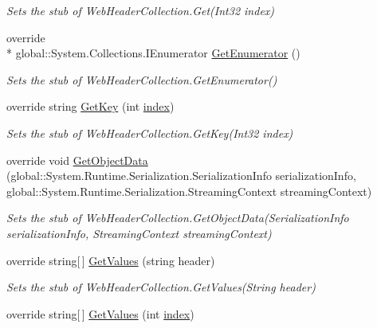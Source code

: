 \begin{DoxyCompactItemize}
\begin{DoxyCompactList}\small\item\em Sets the stub of Web\-Header\-Collection.\-Get(\-Int32 index)\end{DoxyCompactList}\item 
override \\*
global\-::\-System.\-Collections.\-I\-Enumerator \hyperlink{class_system_1_1_net_1_1_fakes_1_1_stub_web_header_collection_a153dadf9ec2a0be4ab2e0a9a643bbaa5}{Get\-Enumerator} ()
\begin{DoxyCompactList}\small\item\em Sets the stub of Web\-Header\-Collection.\-Get\-Enumerator()\end{DoxyCompactList}\item 
override string \hyperlink{class_system_1_1_net_1_1_fakes_1_1_stub_web_header_collection_a9472ccae8fb92b8ece3a7f46afa73ec5}{Get\-Key} (int \hyperlink{jquery-1_810_82-vsdoc_8js_a75bb12d1f23302a9eea93a6d89d0193e}{index})
\begin{DoxyCompactList}\small\item\em Sets the stub of Web\-Header\-Collection.\-Get\-Key(\-Int32 index)\end{DoxyCompactList}\item 
override void \hyperlink{class_system_1_1_net_1_1_fakes_1_1_stub_web_header_collection_a0730e8f40e001f422bf4937a6b2aa1ff}{Get\-Object\-Data} (global\-::\-System.\-Runtime.\-Serialization.\-Serialization\-Info serialization\-Info, global\-::\-System.\-Runtime.\-Serialization.\-Streaming\-Context streaming\-Context)
\begin{DoxyCompactList}\small\item\em Sets the stub of Web\-Header\-Collection.\-Get\-Object\-Data(\-Serialization\-Info serialization\-Info, Streaming\-Context streaming\-Context)\end{DoxyCompactList}\item 
override string\mbox{[}$\,$\mbox{]} \hyperlink{class_system_1_1_net_1_1_fakes_1_1_stub_web_header_collection_a5783eb4c817b8ea8058b57af5d25a83a}{Get\-Values} (string header)
\begin{DoxyCompactList}\small\item\em Sets the stub of Web\-Header\-Collection.\-Get\-Values(\-String header)\end{DoxyCompactList}\item 
override string\mbox{[}$\,$\mbox{]} \hyperlink{class_system_1_1_net_1_1_fakes_1_1_stub_web_header_collection_a8ff00b9468d90b5e6a5fca636d51148a}{Get\-Values} (int \hyperlink{jquery-1_810_82-vsdoc_8js_a75bb12d1f23302a9eea93a6d89d0193e}{index})

\end{DoxyCompactItemize}
